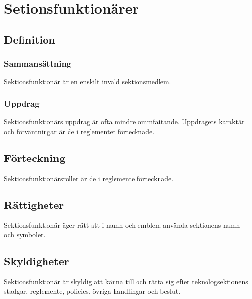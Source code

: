 \section{Setionsfunktionärer}
\subsection{Definition}
\subsubsection{Sammansättning}
Sektionsfunktionär är en enskilt invald sektionsmedlem.
\subsubsection{Uppdrag}
Sektionsfunktionärs uppdrag är ofta mindre ommfattande. Uppdragets karaktär och förväntningar är de i reglementet förtecknade.

\subsection{Förteckning}
Sektionsfunktionärsroller är de i reglemente förtecknade.

\subsection{Rättigheter}
Sektionsfunktionär äger rätt att i namn och emblem använda sektionens namn och symboler.

\subsection{Skyldigheter}
Sektionsfunktionär är skyldig att känna till och rätta sig efter teknologsektionens stadgar, reglemente, policies, övriga handlingar och beslut.
